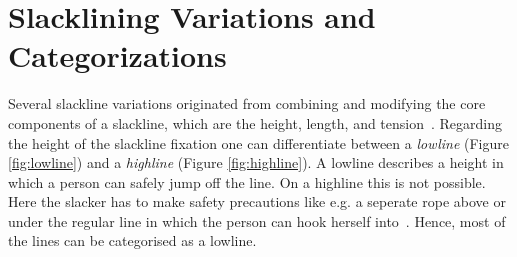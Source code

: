 \section{Slacklining Variations and Categorizations}\label{3_2_slacklineVariations}
Several slackline variations originated from combining and modifying the core components of a slackline, which are the height, length, and tension~\cite{Kleindl2011-bl, MillerMauser2013-sl, Thomann2017-ab}. Regarding the height of the slackline fixation one can differentiate between a \textit{lowline} (Figure \ref{fig:lowline}) and a \textit{highline} (Figure \ref{fig:highline}). A lowline describes a height in which a person can safely jump off the line. On a highline this is not possible. Here the slacker has to make safety precautions like e.g. a seperate rope above or under the regular line in which the person can hook herself into~\cite{Kleindl2011-bl}. Hence, most of the lines can be categorised as a lowline.

